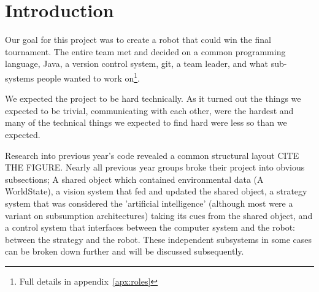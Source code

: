 \section{Introduction}

Our goal for this project was to create a robot that could win the final
tournament. The entire team met and decided on a common programming language,
Java, a version control system, git, a team leader, and what sub-systems people
wanted to work on\footnote{Full details in appendix~\ref{apx:roles}}.

We expected the project to be hard technically. As it turned out the things we
expected to be trivial, communicating with each other, were the hardest and
many of the technical things we expected to find hard were less so than we
expected.

Research into previous year's code revealed a common structural layout CITE THE FIGURE. 
Nearly all previous year groups broke their project into obvious subsections; 
A shared object which contained environmental data (A WorldState), a vision 
system that fed and updated the shared object, a strategy system that was 
considered the 'artificial intelligence' (although most were a variant on subsumption architectures) taking its cues from the shared object, and a control 
system that interfaces between the computer system and the robot: between the 
strategy and the robot. These independent subsystems in some cases can be broken 
down further and will be discussed subsequently. 
